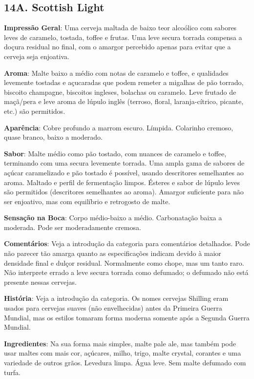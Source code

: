\subsection*{14A. Scottish Light}
\textbf{Impressão Geral}: Uma cerveja maltada de baixo teor alcoólico com sabores leves de caramelo, tostada, toffee e frutas. Uma leve secura torrada compensa a doçura residual no final, com o amargor percebido apenas para evitar que a cerveja seja enjoativa.

\textbf{Aroma}: Malte baixo a médio com notas de caramelo e toffee, e qualidades levemente tostadas e açucaradas que podem remeter a migalhas de pão torrado, biscoito champagne, biscoitos ingleses, bolachas ou caramelo. Leve frutado de maçã/pera e leve aroma de lúpulo inglês (terroso, floral, laranja-cítrico, picante, etc.) são permitidos.

\textbf{Aparência}: Cobre profundo a marrom escuro. Límpida. Colarinho cremoso, quase branco, baixo a moderado.

\textbf{Sabor}: Malte médio como pão tostado, com nuances de caramelo e toffee, terminando com uma secura levemente torrada. Uma ampla gama de sabores de açúcar caramelizado e pão tostado é possível, usando descritores semelhantes ao aroma. Maltado e perfil de fermentação limpos. Ésteres e sabor de lúpulo leves são permitidos (descritores semelhantes ao aroma). Amargor suficiente para não ser enjoativo, mas com equilíbrio e retrogosto de malte.

\textbf{Sensação na Boca}: Corpo médio-baixo a médio. Carbonatação baixa a moderada. Pode ser moderadamente cremosa.

\textbf{Comentários}: Veja a introdução da categoria para comentários detalhados. Pode não parecer tão amarga quanto as especificações indicam devido à maior densidade final e dulçor residual. Normalmente como chope, mas um tanto raro. Não interprete errado a leve secura torrada como defumado; o defumado não está presente nessas cervejas.

\textbf{História}: Veja a introdução da categoria. Os nomes cervejas Shilling eram usados para cervejas suaves (não envelhecidas) antes da Primeira Guerra Mundial, mas os estilos tomaram forma moderna somente após a Segunda Guerra Mundial.

\textbf{Ingredientes}: Na sua forma mais simples, malte pale ale, mas também pode usar maltes com mais cor, açúcares, milho, trigo, malte crystal, corantes e uma variedade de outros grãos. Levedura limpa. Água leve. Sem malte defumado com turfa.

